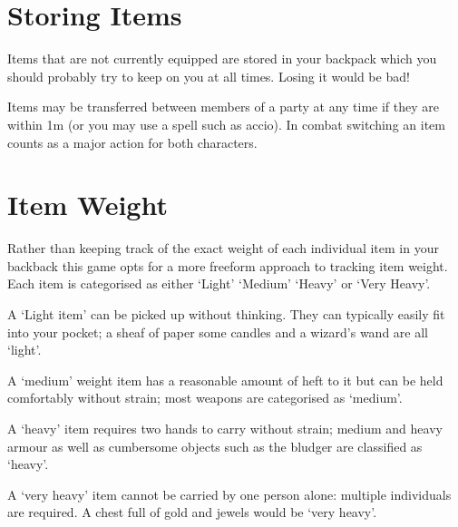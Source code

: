 \section{Storing Items}

Items that are not currently equipped are stored in your backpack\comma{} which you should probably try to keep on you at all times. Losing it would be bad!

Items may be transferred between members of a party at any time\comma{} if they are within 1m (or you may use a spell such as accio). In combat\comma{} switching an item counts as a major action for both characters. 



\section{Item Weight}

Rather than keeping track of the exact weight of each individual item in your backback\comma{} this game opts for a more free\minus{}form approach to tracking item weight. Each item is categorised as either `Light'\comma{} `Medium'\comma{} `Heavy' or `Very Heavy'. 

A `Light item' can be picked up without thinking. They can typically easily fit into your pocket; a sheaf of paper\comma{} some candles and a wizard's wand are all `light'. 

A `medium' weight item has a reasonable amount of heft to it\comma{} but can be held comfortably without strain; most weapons are categorised as `medium'. 

A `heavy' item requires two hands to carry without strain; medium and heavy armour\comma{} as well as cumbersome objects such as the bludger are classified as `heavy'.

A `very heavy' item cannot be carried by one person alone: multiple individuals are required. A chest full of gold and jewels would be `very heavy'. 
